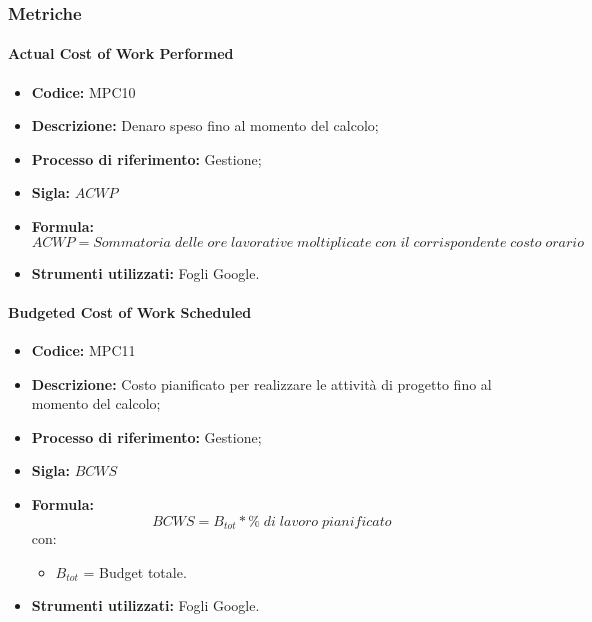 \subsubsection{Metriche}

\paragraph{Actual Cost of Work Performed}
\begin{itemize}
	\item \textbf{Codice:} MPC10
	\item \textbf{Descrizione:} Denaro speso fino al momento del calcolo;
	\item \textbf{Processo di riferimento:} Gestione;
	\item \textbf{Sigla:} $ACWP$
	\item \textbf{Formula:} $$ACWP = {Sommatoria\; delle\; ore\; lavorative\; moltiplicate\; con\; il\; corrispondente\; costo\; orario}$$
	\item \textbf{Strumenti utilizzati:} Fogli Google.
\end{itemize}

\paragraph{Budgeted Cost of Work Scheduled}
\begin{itemize}
	\item \textbf{Codice:} MPC11
	\item \textbf{Descrizione:} Costo pianificato per realizzare le attività di progetto fino al momento del calcolo;
	\item \textbf{Processo di riferimento:} Gestione;
	\item \textbf{Sigla:} $BCWS$
	\item \textbf{Formula:} $$BCWS = {B_{tot} * \% \;di\; lavoro\; pianificato}$$
	con:
	\begin{itemize}
		\item $B_{tot}$ = Budget totale.
	\end{itemize}
	\item \textbf{Strumenti utilizzati:} Fogli Google.
\end{itemize}

